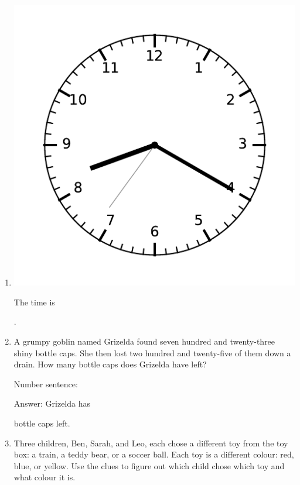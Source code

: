 \documentclass{tufte-book}
\begin{document}
\begin{enumerate}

\item \begin{marginfigure}\includegraphics[width=\textwidth]{fig/clock_0820.pdf}\end{marginfigure}
The time is \dotfill\bigskip\par\dotfill\bigskip.\par

\item A grumpy goblin named Grizelda found seven hundred and twenty-three shiny bottle caps.
She then lost two hundred and twenty-five of them down a drain. How many bottle caps does Grizelda have left?\medskip\par
Number sentence: \dotfill\medskip\par
Answer: Grizelda has 
\dotfill\medskip\par\mbox{}\dotfill\medskip\par\mbox{}\dotfill\bigskip
 bottle caps left.

\item Three children, Ben, Sarah, and Leo, each chose a different toy from
the toy box: a train, a teddy bear, or a soccer ball. Each toy is
a different colour: red, blue, or yellow. Use the clues to figure out
which child chose which toy and what colour it is.


\end{enumerate}
\end{document}
